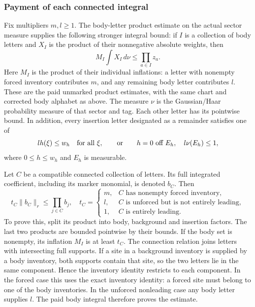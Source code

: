 \subsubsection{Payment of each connected integral}

Fix multipliers $m,l\ge1$. The body-letter product estimate on the
actual sector measure supplies the following stronger integral bound:
if $I$ is a collection of body letters and $X_I$ is the product of
their nonnegative absolute weights, then
\[
 M_I\int X_I\,d\nu\le\prod_{a\in I}z_a.
\]
Here $M_I$ is the product of their individual inflations: a letter
with nonempty forced inventory contributes $m$, and any remaining
body letter contributes $l$. These are the paid unmarked product
estimates, with the same chart and corrected body alphabet as above.
The measure $\nu$ is the Gaussian/Haar probability measure of that
sector and tag. Each other letter has its pointwise bound. In addition,
every insertion letter designated as a remainder satisfies one of
\begin{equation}\label{eq:mixed-shadow}
 l h(\xi)\le w_h\quad\hbox{for all }\xi,
 \qquad\hbox{or}\qquad
 h=0\text{ off }E_h,\quad l\nu(E_h)\le1,
\end{equation}
where $0\le h\le w_h$ and $E_h$ is measurable.

Let $C$ be a compatible connected collection of letters. Its full
integrated coefficient, including its marker monomial, is denoted $b_C$.
Then
\begin{equation}\label{eq:mixed-club-integral}
 t_C\|b_C\|_r\le\prod_{j\in C}b_j,
 \quad
 t_C=\begin{cases}
 m,&C\text{ has nonempty forced inventory},\\
 l,&C\text{ is unforced but is not entirely leading},\\
 1,&C\text{ is entirely leading}.
 \end{cases}
\end{equation}
To prove this, split its product into body, background and insertion
factors. The last two products are bounded pointwise by their bounds.
If the body set is nonempty, its inflation $M_I$ is at least $t_C$.
The connection relation joins letters with intersecting full supports.
If a site in a background inventory is supplied by a body inventory,
both supports contain that site, so the two letters lie in the same
component. Hence the inventory identity restricts to each component.
In the forced case this uses the exact inventory identity: a forced
site must belong to one of the body inventories. In the unforced
nonleading case any body letter supplies $l$. The paid body integral
therefore proves the estimate.


